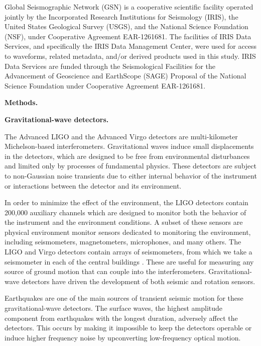 \documentclass[preprint, aps, showpacs]{revtex4-1}
\begin{document}
Global Seismographic Network (GSN) is a cooperative scientific facility operated jointly by the Incorporated Research Institutions for Seismology (IRIS), the United States Geological Survey (USGS), and the National Science Foundation (NSF), under Cooperative Agreement EAR-1261681.
The facilities of IRIS Data Services, and specifically the IRIS Data Management Center, were used for access to waveforms, related metadata, and/or derived products used in this study. IRIS Data Services are funded through the Seismological Facilities for the Advancement of Geoscience and EarthScope (SAGE) Proposal of the National Science Foundation under Cooperative Agreement EAR-1261681.




\textbf{Methods.}

\textbf{Gravitational-wave detectors.}

The Advanced LIGO \cite{aligo} and the Advanced Virgo  \cite{avirgo}  detectors are multi-kilometer Michelson-based interferometers.
Gravitational waves induce small displacements in the detectors, which are designed to be free from environmental disturbances and limited only by processes of fundamental physics.
These detectors are subject to non-Gaussian noise transients due to either internal behavior of the instrument or interactions between the detector and its environment.

In order to minimize the effect of the environment, the LIGO detectors contain 200,000 auxiliary channels which are designed to monitor both the behavior of the instrument and the environment conditions.
A subset of these sensors are physical environment monitor sensors dedicated to monitoring the environment, including seismometers, magnetometers, microphones, and many others.
The LIGO and Virgo detectors contain arrays of seismometers, from which we take a seismometer in each of the central buildings \cite{AbEA2016f}. These are useful for measuring any source of ground motion that can couple into the interferometers.
Gravitational-wave detectors have driven the development of both seismic \cite{BeCa2016} and rotation \cite{VeHa2014} sensors.

Earthquakes are one of the main sources of transient seismic motion for these gravitational-wave detectors. The surface waves, the highest amplitude component from earthquakes with the longest duration, adversely affect the detectors. This occurs by making it impossible to keep the detectors operable or induce higher frequency noise by upconverting low-frequency optical motion.
\end{document}
